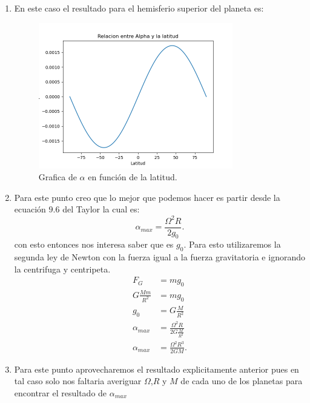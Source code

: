 


    

    \begin{enumerate}
      \item En este caso el resultado para el hemisferio superior del planeta es:
          \begin{figure}[h]
              \centering
              \includegraphics[width=0.8\textwidth]{Graficas/alpha_tierra.png}
              \caption{Grafica de $\alpha$ en función de la latitud.}
              \label{fig:Graficas-alpha_tierra-png}
          \end{figure}
      \item Para este punto creo que lo mejor que podemos hacer es partir desde la ecuación $9.6$ del Taylor la cual es: \[
      \alpha_{max} = \frac{\Omega^2R}{2g_0}
      .\] con esto entonces nos interesa saber que es $g_0$. Para esto utilizaremos la segunda ley de Newton con la fuerza igual a la fuerza gravitatoria e ignorando la centrifuga y centripeta.
      \begin{align*}
        F_G&= mg_0 \\
	G \frac{Mm}{R^2} &= mg_0 \\
	g_0 &= G \frac{M}{R^2} \\
	\alpha_{max} &= \frac{\Omega^2R}{2G \frac{M}{R^2}} \\
	\alpha_{max} &= \frac{\Omega^2R^{3}}{2GM}
      .\end{align*}

    \item Para este punto aprovecharemos el resultado explicitamente anterior pues en tal caso solo nos faltaria averiguar $\Omega$,$R$ y $M$ de cada uno de los planetas para encontrar el resultado de $\alpha_{max}$


\end{enumerate}
